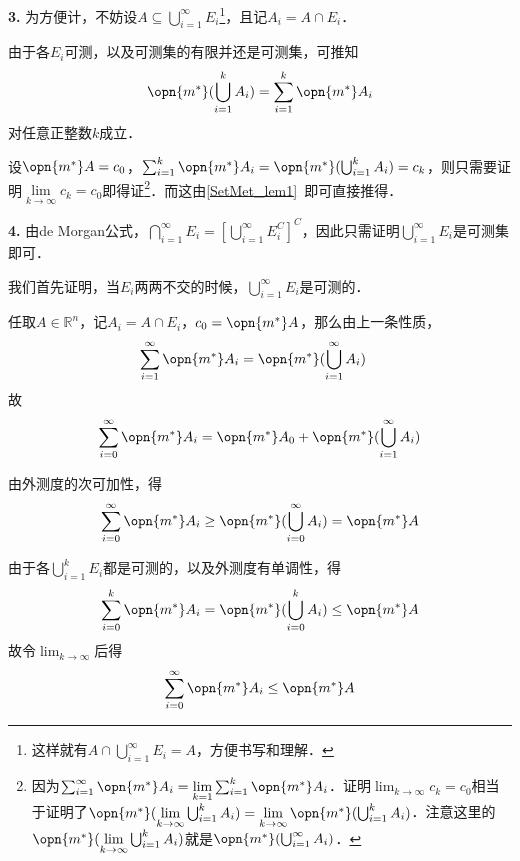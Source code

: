 \textbf{3.} 为方便计，不妨设$A\subseteq \bigcup_{i=1}^\infty E_i$\footnote{这样就有$A\cap \bigcup_{i=1}^{\infty}E_i=A$，方便书写和理解．}，且记$A_i=A\cap E_i$．

由于各$E_i$可测，以及可测集的有限并还是可测集，可推知
\begin{equation}
\opn{m^*}(\bigcup_{i=1}^k A_i)=\sum_{i=1}^k \opn{m^*}A_i
\end{equation}
对任意正整数$k$成立．

设$\opn{m^*}A=c_0$，$\sum_{i=1}^k \opn{m^*}A_i=\opn{m^*}(\bigcup_{i=1}^k A_i)=c_k$，则只需要证明$\lim\limits_{k\to \infty}c_k=c_0$即得证\footnote{因为$\sum_{i=1}^\infty \opn{m^*}A_i=\lim\limits_{k=1}\sum_{i=1}^k\opn{m^*}A_i$．证明$\lim_{k\to\infty}c_k=c_0$相当于证明了$\opn{m^*}(\lim\limits_{k\to\infty}\bigcup^k_{i=1}A_i)=\lim\limits_{k\to\infty}\opn{m^*}(\bigcup^k_{i=1}A_i)$．注意这里的$\opn{m^*}(\lim\limits_{k\to\infty}\bigcup^k_{i=1}A_i)$就是$\opn{m^*}(\bigcup^\infty_{i=1}A_i)$．}．而这由\autoref{SetMet_lem1}~即可直接推得．%

\textbf{4.} 由de Morgan公式，$\bigcap_{i=1}^\infty E_i=[\bigcup_{i=1}^\infty E_i^C]^C$，因此只需证明$\bigcup_{i=1}^\infty E_i$是可测集即可．

我们首先证明，当$E_i$两两不交的时候，$\bigcup^\infty_{i=1}E_i$是可测的．

任取$A\in\mathbb{R}^n$，记$A_i=A\cap E_i$，$c_0=\opn{m^*}A$，那么由上一条性质，
\begin{equation}
\begin{aligned}
\sum^\infty_{i=1}\opn{m^*}A_i&=\opn{m^*}(\bigcup_{i=1}^\infty A_i)
\end{aligned}
\end{equation}
故
\begin{equation}\label{MsbSet_eq2}
\sum^\infty_{i=0}\opn{m^*}A_i=\opn{m^*}A_0+\opn{m^*}(\bigcup_{i=1}^\infty A_i)
\end{equation}


由外测度的次可加性，得
\begin{equation}\label{MsbSet_eq3}
\sum_{i=0}^\infty\opn{m^*}A_i\geq \opn{m^*}(\bigcup_{i=0}^\infty A_i)=\opn{m^*}A
\end{equation}

由于各$\bigcup_{i=1}^k E_i$都是可测的，以及外测度有单调性，得
\begin{equation}
\sum_{i=0}^k\opn{m^*}A_i=\opn{m^*}(\bigcup_{i=0}^k A_i)\leq \opn{m^*}A
\end{equation}
故令$\lim_{k\to \infty}$后得
\begin{equation}\label{MsbSet_eq5}
\sum_{i=0}^\infty\opn{m^*}A_i\leq \opn{m^*}A
\end{equation}


